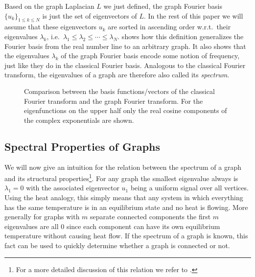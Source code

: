 Based on the graph Laplacian $L$ we just defined, the graph Fourier basis ${\{ u_k \}}_{1 \leq k \leq N}$ is just the set of eigenvectors of $L$.
In the rest of this paper we will assume that these eigenvectors $u_k$ are sorted in ascending order w.r.t.\  their eigenvalues $\lambda_k$, i.e.\  $\lambda_1 \leq \lambda_2 \leq \cdots \leq \lambda_N$.
 shows how this definition generalizes the Fourier basis from the real number line to an arbitrary graph.
It also shows that the eigenvalues $\lambda_k$ of the graph Fourier basis encode some notion of frequency, just like they do in the classical Fourier basis.
Analogous to the classical Fourier transform, the eigenvalues of a graph are therefore also called its \textit{spectrum}.
\begin{figure}[ht]
	\centering
	\caption{%
		Comparison between the basis functions/vectors of the classical Fourier transform and the graph Fourier transform.
		For the eigenfunctions on the upper half only the real cosine components of the complex exponentials are shown.
	}\label{fig:sgt:graphFourier}
\end{figure}

\subsection{Spectral Properties of Graphs}%
\label{sec:sgt:spectrum}

We will now give an intuition for the relation between the spectrum of a graph and its structural properties\footnote{%
	For a more detailed discussion of this relation we refer to \citet{Shuman2013}.
}.
For any graph the smallest eigenvalue always is $\lambda_1 = 0$ with the associated eigenvector $u_1$ being a uniform signal over all vertices.
Using the heat analogy, this simply means that any system in which everything has the same temperature is in an equilibrium state and no heat is flowing.
More generally for graphs with $m$ separate connected components the first $m$ eigenvalues are all $0$ since each component can have its own equilibrium temperature without causing heat flow.
If the spectrum of a graph is known, this fact can be used to quickly determine whether a graph is connected or not.

